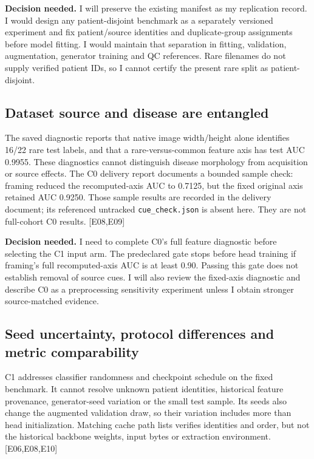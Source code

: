 \documentclass[11pt,a4paper]{article}
\newcommand{\file}[1]{\nolinkurl{#1}}
\newcommand{\ev}[1]{\textcolor{Link}{\textsf{[#1]}}}
\begin{document}
\textbf{Decision needed.} I will preserve the existing manifest as my replication
record. I would design any patient-disjoint benchmark as a separately versioned
experiment and fix patient/source identities and duplicate-group assignments
before model fitting. I would maintain that separation in fitting, validation,
augmentation, generator training and QC references. Rare filenames do not
supply verified patient IDs, so I cannot certify the present rare split as
patient-disjoint.

\subsection{Dataset source and disease are entangled}

The saved diagnostic reports that native image width/height alone identifies
16/22 rare test labels, and that a rare-versus-common feature axis has test AUC
0.9955. These diagnostics cannot distinguish disease morphology from
acquisition or source effects. The C0 delivery report documents a bounded
sample check: framing reduced the recomputed-axis AUC to 0.7125, but the fixed
original axis retained AUC 0.9250. Those sample results are recorded in the
delivery document; its referenced untracked \file{cue_check.json} is absent
here. They are not full-cohort C0 results. \ev{E08,E09}

\textbf{Decision needed.} I need to complete C0's full feature diagnostic before
selecting the C1 input arm. The predeclared gate stops before head training if framing's
full recomputed-axis AUC is at least 0.90. Passing this gate does not establish
removal of source cues. I will also review the fixed-axis diagnostic and
describe C0 as a preprocessing sensitivity experiment unless I obtain stronger
source-matched evidence.

\subsection{Seed uncertainty, protocol differences and metric comparability}

C1 addresses classifier randomness and checkpoint schedule on the fixed
benchmark. It cannot resolve unknown patient identities, historical feature
provenance, generator-seed variation or the small test sample. Its seeds also
change the augmented validation draw, so their variation includes more than
head initialization. Matching cache path lists verifies identities and order,
but not the historical backbone weights, input bytes or extraction environment.
\ev{E06,E08,E10}
\end{document}
